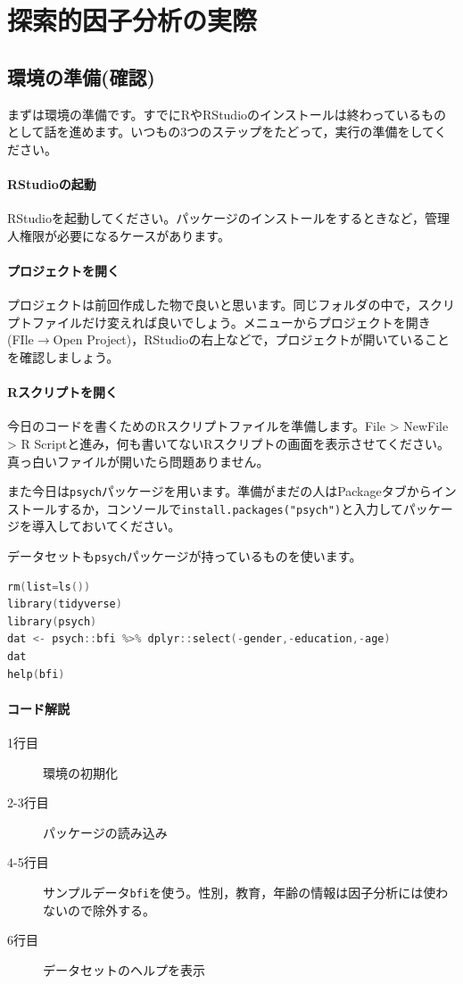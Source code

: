 \documentclass{ltjsbook}
\begin{document}
\section{探索的因子分析の実際}
\subsection{環境の準備(確認)}
まずは環境の準備です。すでにRやRStudioのインストールは終わっているものとして話を進めます。いつもの3つのステップをたどって，実行の準備をしてください。
\paragraph{RStudioの起動}RStudioを起動してください。パッケージのインストールをするときなど，管理人権限が必要になるケースがあります。
\paragraph{プロジェクトを開く}プロジェクトは前回作成した物で良いと思います。同じフォルダの中で，スクリプトファイルだけ変えれば良いでしょう。メニューからプロジェクトを開き(FIle$\to$Open Project)，RStudioの右上などで，プロジェクトが開いていることを確認しましょう。
\paragraph{Rスクリプトを開く}今日のコードを書くためのRスクリプトファイルを準備します。File > NewFile > R Scriptと進み，何も書いてないRスクリプトの画面を表示させてください。真っ白いファイルが開いたら問題ありません。

また今日は\texttt{psych}パッケージ\textcite{psych}を用います。準備がまだの人はPackageタブからインストールするか，コンソールで\texttt{install.packages("psych")}と入力してパッケージを導入しておいてください。

データセットも\texttt{psych}パッケージが持っているものを使います。
\begin{lstlisting}[language=c++,label={code:10_01},caption={サンプルデータを使う}]
rm(list=ls())
library(tidyverse)
library(psych)
dat <- psych::bfi %>% dplyr::select(-gender,-education,-age)
dat
help(bfi)
\end{lstlisting}

\paragraph{コード解説}
\begin{description}
	\item[1行目] 環境の初期化
	\item[2-3行目] パッケージの読み込み
	\item[4-5行目] サンプルデータ\texttt{bfi}を使う。性別，教育，年齢の情報は因子分析には使わないので除外する。
	\item[6行目] データセットのヘルプを表示
\end{description}
\end{document}
